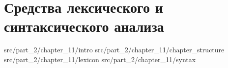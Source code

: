 \chapter{Средства лексического и синтаксического анализа}

 {src/part_2/chapter_11/intro}
 {src/part_2/chapter_11/chapter_structure}
 {src/part_2/chapter_11/lexicon}
 {src/part_2/chapter_11/syntax}

